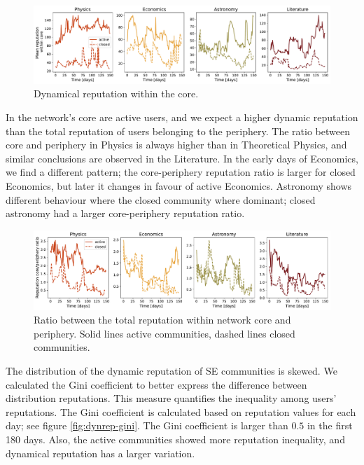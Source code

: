 \begin{figure}[h]
	\centering
	\includegraphics[width=\linewidth]{figures/stackexchange/core_reputation.pdf}
	\caption{Dynamical reputation within the core.}
	\label{fig:dr_core}
\end{figure}

In the network's core are active users, and we expect a higher dynamic reputation than the total reputation of users belonging to the periphery. The ratio between core and periphery in Physics is always higher than in Theoretical Physics, and similar conclusions are observed in the Literature. In the early days of Economics, we find a different pattern; the core-periphery reputation ratio is larger for closed Economics, but later it changes in favour of active Economics. Astronomy shows different behaviour where the closed community where dominant; closed astronomy had a larger core-periphery reputation ratio. 

\begin{figure}[h!]
	\centering
	\includegraphics[width=\linewidth]{figures/stackexchange/core_per_ratio_reputation.pdf}
	\caption[Ratio between the total reputation within network core and periphery.]{Ratio between the total reputation within network core and periphery. Solid lines active communities, dashed lines closed communities.}
	\label{fig:dr_core_per}
\end{figure}

The distribution of the dynamic reputation of SE communities is skewed. We calculated the Gini coefficient to better express the difference between distribution reputations. This measure quantifies the inequality among users’ reputations. The Gini coefficient is calculated based on reputation values for each day; see figure \ref{fig:dynrep-gini}. The Gini coefficient is larger than $0.5$ in the first 180 days. Also, the active communities showed more reputation inequality, and dynamical reputation has a larger variation. 

